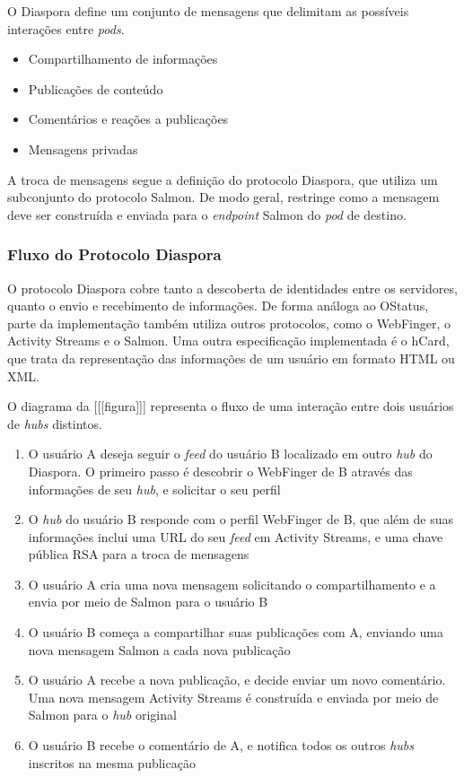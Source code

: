 O Diaspora define um conjunto de mensagens que delimitam as possíveis interações
entre \textit{pods}.

\begin{itemize}
  \item{Compartilhamento de informações}
  \item{Publicações de conteúdo}
  \item{Comentários e reações a publicações}
  \item{Mensagens privadas}
\end{itemize}

A troca de mensagens segue a definição do protocolo Diaspora, que utiliza um
subconjunto do protocolo Salmon. De modo geral, restringe como a mensagem deve ser
construída e enviada para o \textit{endpoint} Salmon do \textit{pod} de destino. 

\subsubsection{Fluxo do Protocolo Diaspora}

O protocolo Diaspora cobre tanto a descoberta de identidades entre os servidores,
quanto o envio e recebimento de informações. De forma análoga ao OStatus, parte da
implementação também utiliza outros protocolos, como o WebFinger, o Activity Streams
e o Salmon. Uma outra especificação implementada é o hCard, que trata da
representação das informações de um usuário em formato HTML ou XML. %

O diagrama da [[[figura]]] representa o fluxo de uma interação entre dois usuários de
\textit{hubs} distintos.



\begin{enumerate}
  \item{O usuário A deseja seguir o \textit{feed} do usuário B localizado em outro
        \textit{hub} do Diaspora. O primeiro passo é descobrir o WebFinger de B
        através das informações de seu \textit{hub}, e solicitar o seu perfil}
  \item{O \textit{hub} do usuário B responde com o perfil WebFinger de B, que além
        de suas informações inclui uma URL do seu \textit{feed} em Activity Streams,
        e uma chave pública RSA para a troca de mensagens}
  \item{O usuário A cria uma nova mensagem solicitando o compartilhamento e a envia
        por meio de Salmon para o usuário B}
  \item{O usuário B começa a compartilhar suas publicações com A, enviando uma nova
        mensagem Salmon a cada nova publicação}
  \item{O usuário A recebe a nova publicação, e decide enviar um novo comentário.
        Uma nova mensagem Activity Streams é construída e enviada por meio de Salmon
        para o \textit{hub} original}
  \item{O usuário B recebe o comentário de A, e notifica todos os outros
        \textit{hubs} inscritos na mesma publicação}
\end{enumerate}

